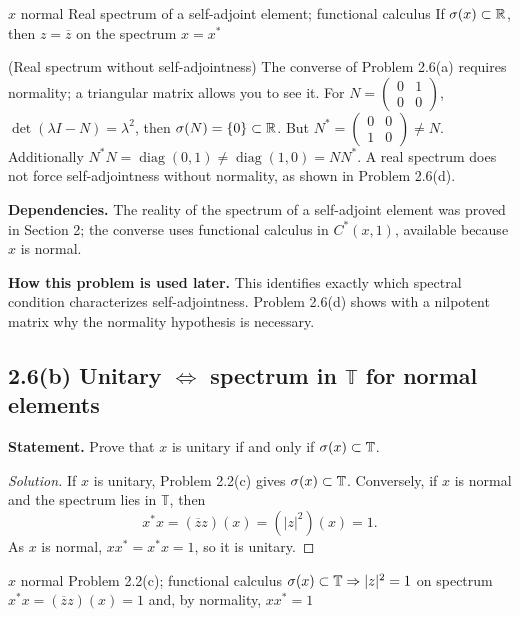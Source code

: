 \proofdiagram
{$x$ normal}
{Real spectrum of a self-adjoint element; functional calculus}
{If $\sigma(x)\subset\mathbb R$, then $z=\overline z$ on the spectrum}
{$x=x^*$}

\begin{cthejemplo}{(Real spectrum without self-adjointness)}
The converse of Problem 2.6(a) requires normality; a triangular matrix allows you to see it.
For $N=\begin{pmatrix}0&1\\0&0\end{pmatrix}$,
$\det(\lambda I-N)=\lambda^2$, then $\sigma(N)=\{0\}\subset\mathbb R$.
But $N^*=\begin{pmatrix}0&0\\1&0\end{pmatrix}\ne N$.
Additionally $N^*N=\operatorname{diag}(0,1)\ne\operatorname{diag}(1,0)=NN^*$.
A real spectrum does not force self-adjointness without normality, as shown in Problem 2.6(d).
\end{cthejemplo}

\noindent\textbf{Dependencies.} The reality of the spectrum of a self-adjoint element was proved in Section 2; the converse uses functional calculus in $C^*(x,1)$, available because $x$ is normal.

\noindent\textbf{How this problem is used later.} This identifies exactly which spectral condition characterizes self-adjointness. Problem 2.6(d) shows with a nilpotent matrix why the normality hypothesis is necessary.

\subsection*{2.6(b) Unitary $\Longleftrightarrow$ spectrum in $\mathbb T$ for normal elements}

\noindent\textbf{Statement.} Prove that $x$ is unitary if and only if $\sigma(x)\subset\mathbb T$.

\begin{proof}[Solution]
If $x$ is unitary, Problem 2.2(c) gives $\sigma(x)\subset\mathbb T$. Conversely, if $x$ is
normal and the spectrum lies in $\mathbb T$, then
\[
 x^*x=(\overline z z)(x)=(|z|^2)(x)=1.
\]
As $x$ is normal, $xx^*=x^*x=1$, so it is unitary.
\end{proof}

\proofdiagram
{$x$ normal}
{Problem 2.2(c); functional calculus}
{$\sigma(x)\subset\mathbb T\Rightarrow |z|^2=1$ on spectrum}
{$x^*x=(\overline z z)(x)=1$ and, by normality, $xx^*=1$}

